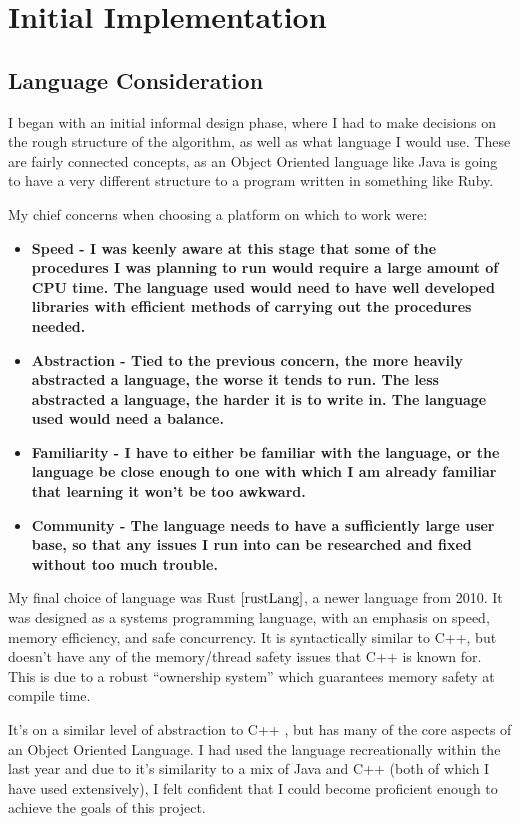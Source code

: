 \section{Initial Implementation}
\subsection{Language Consideration}
I began with an initial informal design phase, where I had to make decisions on the rough structure of the algorithm, as well as what language I would use. These are fairly connected concepts, as an Object Oriented language like Java is going to have a very different structure to a program written in something like Ruby. \newline

My chief concerns when choosing a platform on which to work were:
\begin{itemize}
    \item \bf Speed \rm - I was keenly aware at this stage that some of the procedures I was planning to run would require a large amount of CPU time. The language used would need to have well developed libraries with efficient methods of carrying out the procedures needed.
    \item \bf Abstraction \rm - Tied to the previous concern, the more heavily abstracted a language, the worse it tends to run. The less abstracted a language, the harder it is to write in. The language used would need a balance.
    \item \bf Familiarity \rm - I have to either be familiar with the language, or the language be close enough to one with which I am already familiar that learning it won't be too awkward.
    \item \bf Community \rm - The language needs to have a sufficiently large user base, so that any issues I run into can be researched and fixed without too much trouble.
\end{itemize}

My final choice of language was Rust $\cite{rustLang}$, a newer language from 2010. It was designed as a systems programming language, with an emphasis on speed, memory efficiency, and safe concurrency. It is syntactically similar to C++, but doesn't have any of the memory/thread safety issues that C++ is known for. This is due to a robust ``ownership system'' which guarantees memory safety at compile time. \newline

It's on a similar level of abstraction to C++ , but has many of the core aspects of an Object Oriented Language. I had used the language recreationally within the last year and due to it's similarity to a mix of Java and C++ (both of which I have used extensively), I felt confident that I could become proficient enough to achieve the goals of this project.


